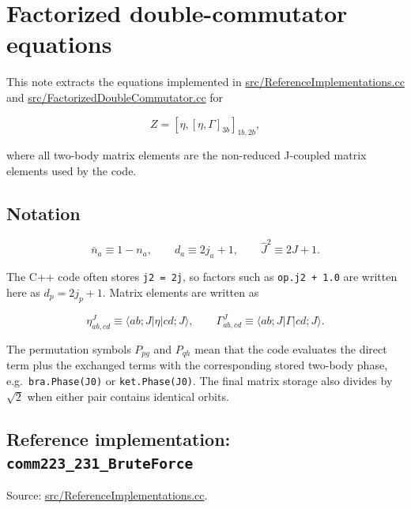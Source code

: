 \documentclass[
]{article}
\author{}
\date{}
\begin{document}
\section{Factorized double-commutator
equations}\label{factorized-double-commutator-equations}

This note extracts the equations implemented in
\href{../src/ReferenceImplementations.cc}{src/ReferenceImplementations.cc}
and
\href{../src/FactorizedDoubleCommutator.cc}{src/FactorizedDoubleCommutator.cc}
for

\begin{equation}
Z = [\eta,[\eta,\Gamma]_{3b}]_{1b,2b},
\end{equation}

where all two-body matrix elements are the non-reduced J-coupled matrix
elements used by the code.

\subsection{Notation}\label{notation}

\begin{equation}
\bar n_a \equiv 1-n_a, \qquad d_a \equiv 2j_a+1, \qquad \hat J^2 \equiv 2J+1.
\end{equation}

The C++ code often stores \texttt{j2\ =\ 2j}, so factors such as
\texttt{op.j2\ +\ 1.0} are written here as \(d_p = 2j_p+1\). Matrix
elements are written as

\begin{equation}
\eta^J_{ab,cd} \equiv \langle ab;J | \eta | cd;J\rangle,
\qquad
\Gamma^J_{ab,cd} \equiv \langle ab;J | \Gamma | cd;J\rangle .
\end{equation}

The permutation symbols \(P_{pg}\) and \(P_{qh}\) mean that the code
evaluates the direct term plus the exchanged terms with the
corresponding stored two-body phase, e.g.~\texttt{bra.Phase(J0)} or
\texttt{ket.Phase(J0)}. The final matrix storage also divides by
\(\sqrt2\) when either pair contains identical orbits.

\subsection{\texorpdfstring{Reference implementation:
\texttt{comm223\_231\_BruteForce}}{Reference implementation: comm223\_231\_BruteForce}}\label{reference-implementation-comm223_231_bruteforce}

Source:
\href{../src/ReferenceImplementations.cc\#L6620-L7352}{src/ReferenceImplementations.cc}.
\end{document}
